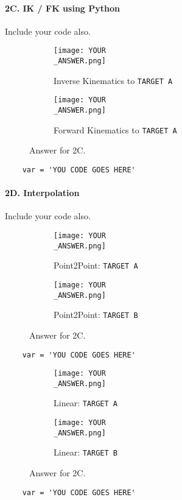 \newpage
\paragraph{2C. IK / FK using Python}
Include your code also.

\begin{figure}[hb!]
     \centering
    \begin{subfigure}[b]{0.3\textwidth}
        \texttt{[image: YOUR\\\_ANSWER.png]}
         \caption*{Inverse Kinematics to \texttt{TARGET A}}
     \end{subfigure}
     \hfill
     \begin{subfigure}[b]{0.3\textwidth}
        \texttt{[image: YOUR\\\_ANSWER.png]}
         \caption*{Forward Kinematics to \texttt{TARGET A}}
     \end{subfigure}
    \caption*{Answer for 2C.}
\end{figure}

\begin{verbatim}
    var = 'YOU CODE GOES HERE'
\end{verbatim}

\newpage
\paragraph{2D. Interpolation}
Include your code also.

\begin{figure}[hb!]
     \centering
    \begin{subfigure}[b]{0.3\textwidth}
        \texttt{[image: YOUR\\\_ANSWER.png]}
         \caption*{Point2Point: \texttt{TARGET A}}
     \end{subfigure}
     \hfill
     \begin{subfigure}[b]{0.3\textwidth}
        \texttt{[image: YOUR\\\_ANSWER.png]}
         \caption*{Point2Point: \texttt{TARGET B}}
     \end{subfigure}
    \caption*{Answer for 2C.}
\end{figure}
%
\begin{verbatim}
    var = 'YOU CODE GOES HERE'
\end{verbatim}

\newpage
\begin{figure}[hb!]
     \centering
    \begin{subfigure}[b]{0.3\textwidth}
        \texttt{[image: YOUR\\\_ANSWER.png]}
         \caption*{Linear: \texttt{TARGET A}}
     \end{subfigure}
     \hfill
     \begin{subfigure}[b]{0.3\textwidth}
        \texttt{[image: YOUR\\\_ANSWER.png]}
         \caption*{Linear: \texttt{TARGET B}}
     \end{subfigure}
    \caption*{Answer for 2C.}
\end{figure}
%
\begin{verbatim}
    var = 'YOU CODE GOES HERE'
\end{verbatim}


